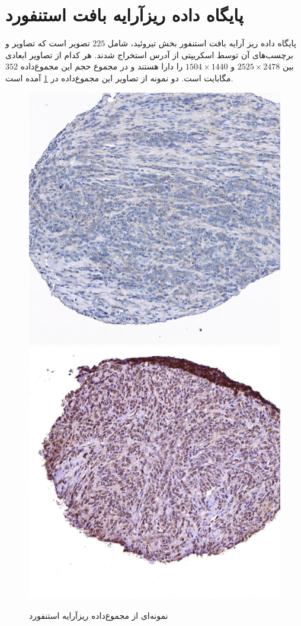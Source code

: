 \section{پایگاه داده ریزآرایه بافت استنفورد}\label{subsec:پایگاه-داده-ریزآرایه-بافت-استنفورد}
پایگاه داده ریز آرایه بافت استنفور\cite{marinelli2007stanford} بخش تیروئید، شامل $225$ تصویر است که تصاویر و برچسب‌های آن توسط اسکریپتی از آدرس \cite{stanfortissuemicroarray} استخراج شدند.
هر کدام از تصاویر ابعادی بین
$2525\times2478$
و
$1504\times1440$
را دارا هستند و در مجموع حجم این مجموع‌داده $352$ مگابایت است.
دو نمونه از تصاویر این مجموع‌داده در \ref{stanfordsample} آمده است.
\begin{figure}
	\begin{center}
		\includegraphics[width=0.48\linewidth]{figs/databases/C-TA-88-01.300.cd81_1_88_7_3_300_1469_29.jpeg}
		\includegraphics[width=0.48\linewidth]{figs/databases/C-TA-99-01.125.cyclind2_1_99_9_3_125_1365_31.jpeg}
	\end{center}
	\caption{نمونه‌ای از مجموع‌داده ریزآرایه استنفورد}
	\label{stanfordsample}
\end{figure}
